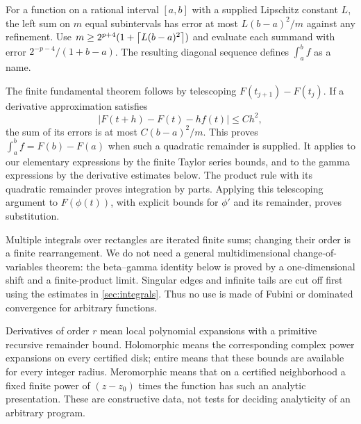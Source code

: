 For a function on a rational interval $[a,b]$ with a supplied Lipschitz
constant $L$, the left sum on $m$ equal subintervals has error at most
$L(b-a)^2/m$ against any refinement. Use
$m\ge2^{p+4}(1+\left\lceil L(b-a)^2\right\rceil)$ and evaluate each summand with
error $2^{-p-4}/(1+b-a)$. The resulting diagonal sequence defines
$\int_a^b f$ as a name.

The finite fundamental theorem follows by telescoping
$F(t_{j+1})-F(t_j)$. If a derivative approximation satisfies
\[
 |F(t+h)-F(t)-h f(t)|\le C h^2,
\]
the sum of its errors is at most $C(b-a)^2/m$. This proves
$\int_a^b f=F(b)-F(a)$ when such a quadratic remainder is supplied.
It applies to our elementary expressions by the finite Taylor series
bounds, and to the gamma expressions by the derivative estimates below.
The product rule with its quadratic remainder proves integration by
parts. Applying this telescoping argument to $F(\phi(t))$, with
explicit bounds for $\phi'$ and its remainder, proves substitution.

Multiple integrals over rectangles are iterated finite sums; changing
their order is a finite rearrangement. We do not need a general
multidimensional change-of-variables theorem: the beta--gamma identity
below is proved by a one-dimensional shift and a finite-product limit.
Singular edges and infinite tails are cut off first using the estimates
in \cref{sec:integrals}. Thus no use is made of Fubini or dominated
convergence for arbitrary functions.

Derivatives of order $r$ mean local polynomial expansions with a
primitive recursive remainder bound. Holomorphic means the corresponding
complex power expansions on every certified disk; entire means that
these bounds are available for every integer radius. Meromorphic means
that on a certified neighborhood a fixed finite power of $(z-z_0)$ times
the function has such an analytic presentation. These are constructive
data, not tests for deciding analyticity of an arbitrary program.
